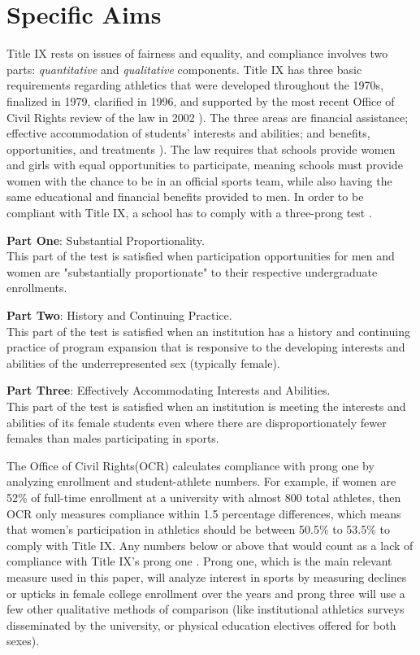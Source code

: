 \documentclass[11pt]{article}
\begin{document}
\section{Specific Aims}

Title IX rests on issues of fairness and equality, and compliance involves two parts: \emph{quantitative} and \emph{qualitative} components. Title IX has three basic requirements regarding athletics that were developed throughout the 1970s, finalized in 1979, clarified in 1996, and supported by the most recent Office of Civil Rights review of the law in 2002 \cite{Watson}). The three areas are financial assistance; effective accommodation of students' interests and abilities; and benefits, opportunities, and treatments \cite{Watson}). The law requires that schools provide women and girls with equal opportunities to participate, meaning schools must provide women with the chance to be in an official sports team, while also having the same educational and financial benefits provided to men. In order to be compliant with Title IX, a school has to comply with a three-prong test \cite{Mak}.

\textbf{Part One}: Substantial Proportionality.\\
This part of the test is satisfied when participation opportunities for men and women are "substantially proportionate" to their respective undergraduate enrollments. 

\textbf{Part Two}: History and Continuing Practice. \\
This part of the test is satisfied when an institution has a history and continuing practice of program expansion that is responsive to the developing interests and abilities of the underrepresented sex (typically female). 

\textbf{Part Three}: Effectively Accommodating Interests and Abilities. \\ This part of the test is satisfied when an institution is meeting the interests and abilities of its female students even where there are disproportionately fewer females than males participating in sports.

The Office of Civil Rights(OCR) calculates compliance with prong one by analyzing enrollment and student-athlete numbers. For example, if women are 52\% of full-time enrollment at a university with almost 800 total athletes, then OCR only measures compliance within 1.5 percentage differences, which means that women's participation in athletics should be between 50.5\% to 53.5\% to comply with Title IX. Any numbers below or above that would count as a lack of compliance with Title IX's prong one \cite{Schwarz}. Prong one, which is the main relevant measure used in this paper, will analyze interest in sports by measuring declines or upticks in female college enrollment over the years and prong three will use a few other qualitative methods of comparison (like institutional athletics surveys disseminated by the university, or physical education electives offered for both sexes).
\end{document}
